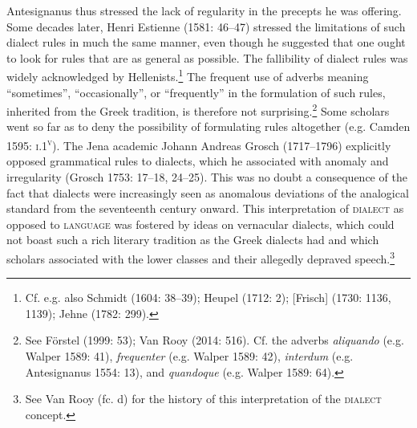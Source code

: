 \begin{styleStandard}
Antesignanus thus stressed the lack of regularity in the precepts he was offering. Some decades later, Henri Estienne (1581: 46–47) stressed the limitations of such dialect rules in much the same manner, even though he suggested that one ought to look for rules that are as general as possible. The fallibility of dialect rules was widely acknowledged by Hellenists.\footnote{\textrm{ Cf. e.g. also Schmidt (1604: 38–39); Heupel (1712: 2); [Frisch] (1730: 1136, 1139); Jehne (1782: 299).}} The frequent use of adverbs meaning “sometimes”, “occasionally”, or “frequently” in the formulation of such rules, inherited from the Greek tradition, is therefore not surprising.\footnote{\textrm{ See Förstel (1999: 53); Van Rooy (2014: 516). Cf. the adverbs }\textrm{\textit{aliquando}}\textrm{ (e.g. Walper 1589: 41), }\textrm{\textit{frequenter}}\textrm{ (e.g. Walper 1589: 42), }\textrm{\textit{interdum}}\textrm{ (e.g. Antesignanus 1554: 13),}\textrm{\textit{ }}\textrm{and }\textrm{\textit{quandoque}}\textrm{ (e.g. Walper 1589: 64).}} Some scholars went so far as to deny the possibility of formulating rules altogether (e.g. Camden 1595: \textsc{i}.1\textsc{\textsuperscript{v}}). The Jena academic Johann Andreas Grosch (1717–1796) explicitly opposed grammatical rules to dialects, which he associated with anomaly and irregularity (Grosch 1753: 17–18, 24–25). This was no doubt a consequence of the fact that dialects were increasingly seen as anomalous deviations of the analogical standard from the seventeenth century onward. This interpretation of \textsc{dialect }as opposed to \textsc{language }was fostered by ideas on vernacular dialects, which could not boast such a rich literary tradition as the Greek dialects had and which scholars associated with the lower classes and their allegedly depraved speech.\footnote{\textrm{ See Van Rooy (fc. d) for the history of this interpretation of the }\textrm{\textsc{dialect}}\textrm{ concept.}}
\end{styleStandard}

